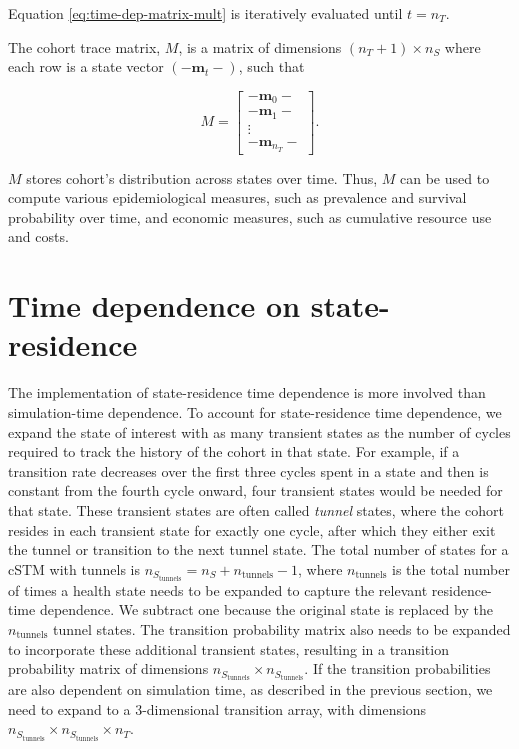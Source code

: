 \documentclass[
]{article}
\begin{document}
Equation \eqref{eq:time-dep-matrix-mult} is iteratively evaluated until \(t = n_T\).

The cohort trace matrix, \(M\), is a matrix of dimensions \((n_T+1) \times n_S\) where each row is a state vector \((-\mathbf{m}_{t}-)\), such that

\[
  M = 
  \begin{bmatrix}
    - \mathbf{m}_0 -  \\
    - \mathbf{m}_1 -  \\
     \vdots \\
    - \mathbf{m}_{n_T} -  
  \end{bmatrix}. 
\]

\(M\) stores cohort's distribution across states over time. Thus, \(M\) can be used to compute various epidemiological measures, such as prevalence and survival probability over time, and economic measures, such as cumulative resource use and costs.

\hypertarget{time-dependence-on-state-residence}{%
\section{Time dependence on state-residence}\label{time-dependence-on-state-residence}}

The implementation of state-residence time dependence is more involved than simulation-time dependence. To account for state-residence time dependence, we expand the state of interest with as many transient states as the number of cycles required to track the history of the cohort in that state. For example, if a transition rate decreases over the first three cycles spent in a state and then is constant from the fourth cycle onward, four transient states would be needed for that state. These transient states are often called \emph{tunnel} states, where the cohort resides in each transient state for exactly one cycle, after which they either exit the tunnel or transition to the next tunnel state. The total number of states for a cSTM with tunnels is \(n_{S_\text{tunnels}} = n_S + n_{\text{tunnels}} - 1\), where \(n_{\text{tunnels}}\) is the total number of times a health state needs to be expanded to capture the relevant residence-time dependence. We subtract one because the original state is replaced by the \(n_{\text{tunnels}}\) tunnel states. The transition probability matrix also needs to be expanded to incorporate these additional transient states, resulting in a transition probability matrix of dimensions \(n_{S_\text{tunnels}} \times n_{S_\text{tunnels}}\). If the transition probabilities are also dependent on simulation time, as described in the previous section, we need to expand to a 3-dimensional transition array, with dimensions \(n_{S_\text{tunnels}} \times n_{S_\text{tunnels}} \times n_T\).
\end{document}
